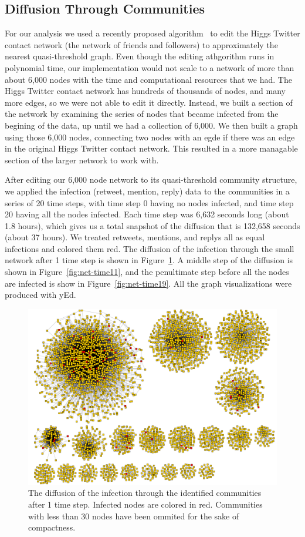 \documentclass[12pt, oneside, openany]{article} %
\begin{document}
\subsection{Diffusion Through Communities}
For our analysis we used a recently proposed algorithm~\cite{brandes} to edit the Higgs Twitter contact network (the network of friends and followers) to approximately the nearest quasi-threshold graph. Even though the editing athgorithm runs in polynomial time, our implementation would not scale to a network of more than about 6,000 nodes with the time and computational resources that we had. The Higgs Twitter contact network has hundreds of thousands of nodes, and many more edges, so we were not able to edit it directly. Instead, we built a section of the network by examining the series of nodes that became infected from the begining of the data, up until we had a collection of 6,000. We then built a graph using those 6,000 nodes, connecting two nodes with an egde if there was an edge in the original Higgs Twitter contact network. This resulted in a more managable section of the larger network to work with.

After editing our 6,000 node network to its quasi-threshold community structure, we applied the infection (retweet, mention, reply) data to the communities in a series of 20 time steps, with time step 0 having no nodes infected, and time step 20 having all the nodes infected. Each time step was 6,632 seconds long (about 1.8 hours), which gives us a total snapshot of the diffusion that is 132,658 seconds (about 37 hours). We treated retweets, mentions, and replys all as equal infections and colored them red. The diffusion of the infection through the small network after 1 time step is shown in Figure~\ref{fig:net-time1}. A middle step of the diffusion is shown in Figure~\ref{fig:net-time11}, and the penultimate step before all the nodes are infected is show in Figure~\ref{fig:net-time19}. All the graph visualizations were produced with yEd.

\begin{figure}
\centering
    \includegraphics[scale=0.25]{step1.png}
    \caption{The diffusion of the infection through the identified communities after 1 time step. Infected nodes are colored in red. Communities with less than 30 nodes have been ommited for the sake of compactness.}
    \label{fig:net-time1}
\end{figure}
\end{document}
